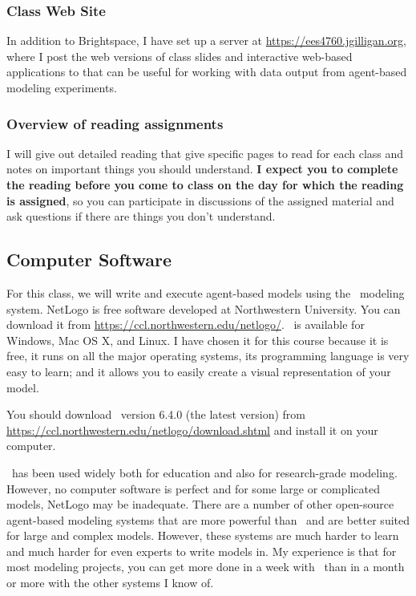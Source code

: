 \documentclass[11pt,twoside]{jgsyllabus}\usepackage[]{graphicx}\usepackage[]{xcolor}
\begin{document}
\subsubsection{Class Web Site}
In addition to Brightspace,
I have set up a server at \url{https://ees4760.jgilligan.org}, where I post the
web versions of class slides and interactive web-based applications to that can
be useful for working with data output from agent-based modeling experiments.

\subsubsection{Overview of reading assignments}
I will give out detailed reading that give specific pages to read for each class
and notes on important things you should understand.
\textbf{I expect you to complete the reading before you come to class on the day
for which the reading is assigned}, so you can participate in discussions of the
assigned material and ask questions if there are things you don't understand.

\subsection{Computer Software}
For this class, we will write and execute agent-based models using the \NetLogo\
modeling system. NetLogo is free software developed at Northwestern University.
You can download it from \url{https://ccl.northwestern.edu/netlogo/}.
\NetLogo\ is available for Windows, Mac OS X, and Linux.
I have chosen it for this course because it is free, it runs on all the major
operating systems, its programming language is very easy to learn; and it allows
you to easily create a visual representation of your model.

You should download \NetLogo\ version 6.4.0 (the latest version) from
\url{https://ccl.northwestern.edu/netlogo/download.shtml}
and install it on your computer.

\NetLogo\ has been used widely both for education and also for research-grade
modeling. However, no computer software is perfect and for some large or
complicated models, NetLogo may be inadequate.
There are a number of other
open-source agent-based modeling systems that are more powerful than \NetLogo\
and are better suited for large and complex models. However, these systems are
much harder to learn and much harder for even experts to write models in.
My experience is that for most modeling projects, you can get more done in a
week with \NetLogo\ than in a month or more with the other systems I know of.
\end{document}
